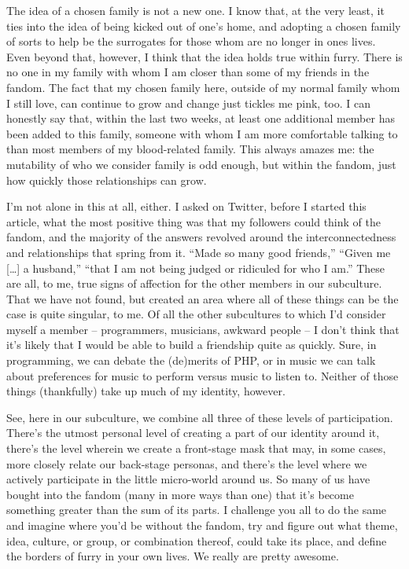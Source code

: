 The idea of a chosen family is not a new one.  I know that, at the very least, it ties into the idea of being kicked out of one's home, and adopting a chosen family of sorts to help be the surrogates for those whom are no longer in ones lives.  Even beyond that, however, I think that the idea holds true within furry.  There is no one in my family with whom I am closer than some of my friends in the fandom.  The fact that my chosen family here, outside of my normal family whom I still love, can continue to grow and change just tickles me pink, too.  I can honestly say that, within the last two weeks, at least one additional member has been added to this family, someone with whom I am more comfortable talking to than most members of my blood-related family.  This always amazes me: the mutability of who we consider family is odd enough, but within the fandom, just how quickly those relationships can grow.

I'm not alone in this at all, either.  I asked on Twitter, before I started this article, what the most positive thing was that my followers could think of the fandom, and the majority of the answers revolved around the interconnectedness and relationships that spring from it.  ``Made so many good friends,'' ``Given me [\ldots] a husband,'' ``that I am not being judged or ridiculed for who I am.''  These are all, to me, true signs of affection for the other members in our subculture.  That we have not found, but created an area where all of these things can be the case is quite singular, to me.  Of all the other subcultures to which I'd consider myself a member -- programmers, musicians, awkward people -- I don't think that it's likely that I would be able to build a friendship quite as quickly.  Sure, in programming, we can debate the (de)merits of PHP, or in music we can talk about preferences for music to perform versus music to listen to.  Neither of those things (thankfully) take up much of my identity, however.

See, here in our subculture, we combine all three of these levels of participation.  There's the utmost personal level of creating a part of our identity around it, there's the level wherein we create a front-stage mask that may, in some cases, more closely relate our back-stage personas, and there's the level where we actively participate in the little micro-world around us.  So many of us have bought into the fandom (many in more ways than one) that it's become something greater than the sum of its parts.  I challenge you all to do the same and imagine where you'd be without the fandom, try and figure out what theme, idea, culture, or group, or combination thereof, could take its place, and define the borders of furry in your own lives.  We really are pretty awesome.
